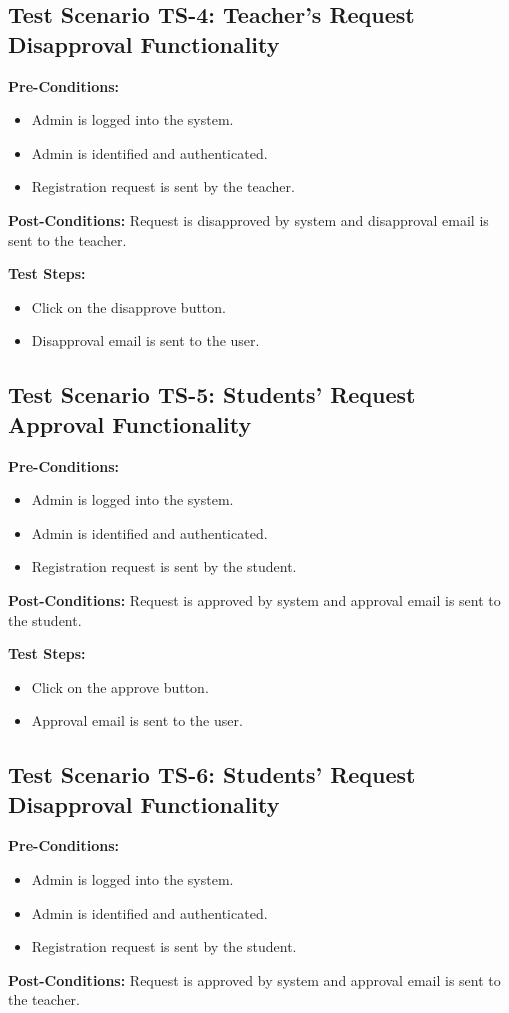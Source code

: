 \subsection{Test Scenario TS-4: Teacher's Request Disapproval Functionality}
\textbf{Pre-Conditions: }
\begin{itemize}

\item Admin is logged into the system.
\item Admin is identified and authenticated.
\item Registration request is sent by the teacher.

\end{itemize}
\textbf{Post-Conditions: } Request is disapproved by system and disapproval email is sent to the teacher. 

\textbf{Test Steps:}
\begin{itemize}

\item Click on the disapprove button.
\item Disapproval email is sent to the user.

\end{itemize}

\subsection{Test Scenario TS-5: Students' Request Approval Functionality}
\textbf{Pre-Conditions: }
\begin{itemize}

\item Admin is logged into the system.
\item Admin is identified and authenticated.
\item Registration request is sent by the student.

\end{itemize}
\textbf{Post-Conditions: } Request is approved by system and approval email is sent to the student. 

\textbf{Test Steps:}
\begin{itemize}

\item Click on the approve button.
\item Approval email is sent to the user.

\end{itemize}

\subsection{Test Scenario TS-6: Students' Request Disapproval Functionality}
\textbf{Pre-Conditions: }
\begin{itemize}

\item Admin is logged into the system.
\item Admin is identified and authenticated.
\item Registration request is sent by the student.

\end{itemize}
\textbf{Post-Conditions: } Request is approved by system and approval email is sent to the teacher. 

